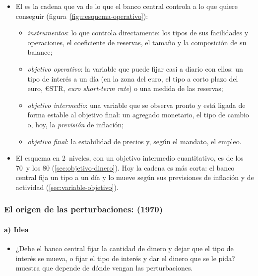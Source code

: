 \documentclass[11pt]{article}
\begin{document}
\begin{itemize}
\item El  es la cadena que va de lo que el banco central controla a lo que quiere conseguir (figura~\ref{figu:esquema-operativo}):
  \begin{itemize}
  \item \emph{instrumentos}: lo que controla directamente: los tipos de sus facilidades y operaciones, el coeficiente de reservas, el tamaño y la composición de su balance;
  \item \emph{objetivo operativo}: la variable que puede fijar casi a diario con ellos: un tipo de interés a un día (en la zona del euro, el tipo a corto plazo del euro, €STR, \emph{euro short-term rate}) o una medida de las reservas;
  \item \emph{objetivo intermedio}: una variable que se observa pronto y está ligada de forma estable al objetivo final: un agregado monetario, el tipo de cambio o, hoy, la \emph{previsión} de inflación;
  \item \emph{objetivo final}: la estabilidad de precios y, según el mandato, el empleo.
  \end{itemize}
\item El esquema en 2~niveles, con un objetivo intermedio cuantitativo, es de los 70~y los 80 (\ref{sec:objetivo-dinero}). Hoy la cadena es más corta: el banco central fija un tipo a un día y lo mueve según sus previsiones de inflación y de actividad (\ref{sec:variable-objetivo}).
\end{itemize}

\begin{infografia}[H]
\centering
\caption{El esquema operativo de la política monetaria}\label{figu:esquema-operativo}
\end{infografia}

\subsubsection{El origen de las perturbaciones:  (1970)}\label{sec:poole}

\paragraph{a) Idea}

\begin{itemize}
\item ¿Debe el banco central fijar la cantidad de dinero y dejar que el tipo de interés se mueva, o fijar el tipo de interés y dar el dinero que se le pida? \textcite{Poole1970Optimal} muestra que depende de dónde vengan las perturbaciones.
\end{itemize}
\end{document}
